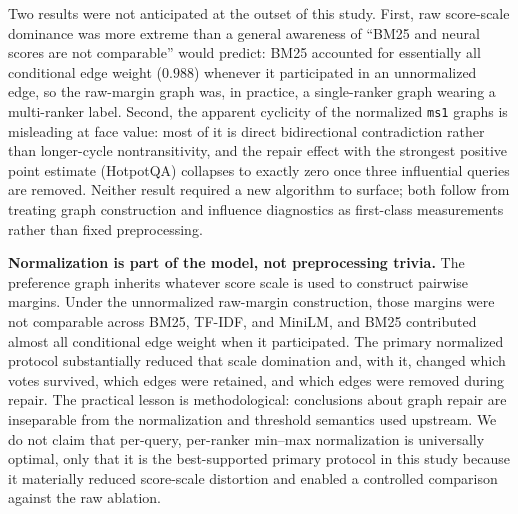 \documentclass[manuscript,anonymous,review]{acmart}
\begin{document}
Two results were not anticipated at the outset of this study. First, raw
score-scale dominance was more extreme than a general awareness of ``BM25 and
neural scores are not comparable'' would predict: BM25 accounted for
essentially all conditional edge weight ($0.988$) whenever it participated in
an unnormalized edge, so the raw-margin graph was, in practice, a
single-ranker graph wearing a multi-ranker label. Second, the apparent
cyclicity of the normalized \texttt{ms1} graphs is misleading at face value:
most of it is direct bidirectional contradiction rather than longer-cycle
nontransitivity, and the repair effect with the strongest positive point
estimate (HotpotQA) collapses to exactly zero once three influential queries
are removed. Neither result required a new algorithm to surface; both follow
from treating graph construction and influence diagnostics as first-class
measurements rather than fixed preprocessing.

\textbf{Normalization is part of the model, not preprocessing trivia.} The
preference graph inherits whatever score scale is used to construct pairwise
margins. Under the unnormalized raw-margin construction, those margins were not
comparable across BM25, TF-IDF, and MiniLM, and BM25 contributed almost all
conditional edge weight when it participated. The primary normalized protocol
substantially reduced that scale domination and, with it, changed which votes
survived, which edges were retained, and which edges were removed during
repair. The practical lesson is methodological: conclusions about graph repair
are inseparable from the normalization and threshold semantics used upstream.
We do not claim that per-query, per-ranker min--max normalization is universally
optimal, only that it is the best-supported primary protocol in this study
because it materially reduced score-scale distortion and enabled a controlled
comparison against the raw ablation.
\end{document}
